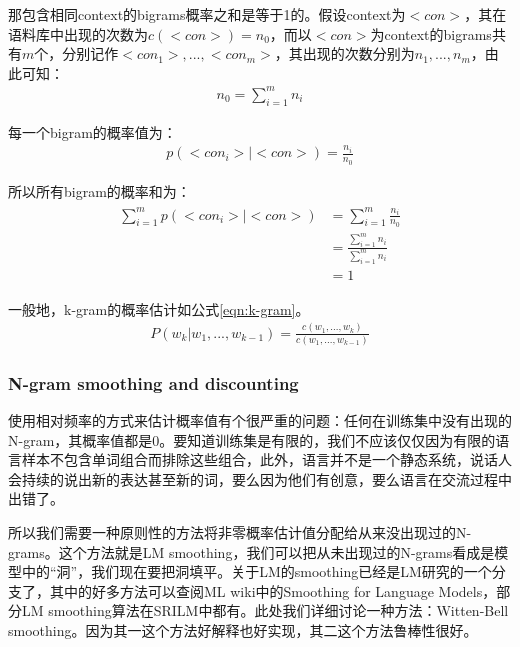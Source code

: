 那包含相同context的bigrams概率之和是等于1的。假设context为$<con>$，其在语料库中出现的次数为$c(<con>)=n_0$，而以$<con>$为context的bigrams共有$m$个，分别记作$<con_1>,...,<con_m>$，其出现的次数分别为$n_1,...,n_m$，由此可知：
\begin{align}\nonumber
n_0 = \sum_{i=1}^{m}n_i
\end{align}

每一个bigram的概率值为：
\begin{align}\nonumber
p(<con_i>|<con>)= \frac{n_i}{n_0}
\end{align}

所以所有bigram的概率和为：
\begin{align}\nonumber
\begin{split}
\sum_{i=1}^{m}p(<con_i>|<con>) &= \sum_{i=1}^{m}\frac{n_i}{n_0}  \\
																&= \frac{\sum_{i=1}^{m}n_i}{\sum_{i=1}^{m}n_i}  \\
																&= 1
\end{split}
\end{align}

一般地，k-gram的概率估计如公式\ref{eqn:k-gram}。
\begin{align}
\label{eqn:k-gram}
P(w_k|w_1,...,w_{k-1}) = \frac{c(w_1,...,w_k)}{c(w_1,...,w_{k-1})}
\end{align}

\subsubsection{N-gram smoothing and discounting}
使用相对频率的方式来估计概率值有个很严重的问题：任何在训练集中没有出现的N-gram，其概率值都是0。要知道训练集是有限的，我们不应该仅仅因为有限的语言样本不包含单词组合而排除这些组合，此外，语言并不是一个静态系统，说话人会持续的说出新的表达甚至新的词，要么因为他们有创意，要么语言在交流过程中出错了。

所以我们需要一种原则性的方法将非零概率估计值分配给从来没出现过的N-grams。这个方法就是LM smoothing，我们可以把从未出现过的N-grams看成是模型中的“洞”，我们现在要把洞填平。关于LM的smoothing已经是LM研究的一个分支了，其中的好多方法可以查阅ML wiki中的Smoothing for Language Models，部分LM smoothing算法在SRILM中都有。此处我们详细讨论一种方法：Witten-Bell smoothing。因为其一这个方法好解释也好实现，其二这个方法鲁棒性很好。

